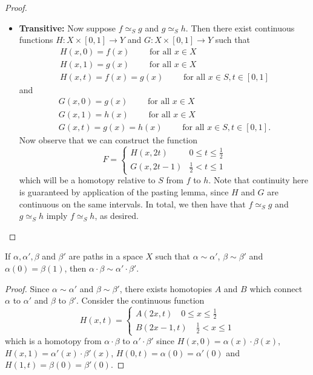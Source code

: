 \documentclass[a4paper,12pt,twoside]{hmcpset}
\begin{document}
\begin{proof}
\begin{itemize}
        \item \textbf{Transitive:} Now suppose $f \simeq_S g$ and $g \simeq_S h$.
        Then there exist continuous functions $H: X \times [0, 1] \to
        Y$ and $G : X \times [0, 1] \to Y$ such that 
        \begin{gather*}
            H(x, 0) = f(x) \qquad \text{ for all } x \in X\\
            H(x, 1) = g(x) \qquad \text{ for all } x \in X\\
            H(x, t) = f(x) = g(x) \qquad \text{ for all } x \in S, t \in [0, 1]
        \end{gather*}
        and 
        \begin{gather*}
            G(x, 0) = g(x) \qquad \text{ for all } x \in X\\
            G(x, 1) = h(x) \qquad \text{ for all } x \in X\\
            G(x, t) = g(x) = h(x) \qquad \text{ for all } x \in S, t \in [0, 1].
        \end{gather*}
        Now observe that we can construct the function
        \[
           F =
           \begin{cases}
               H(x, 2t) & 0 \le t \le \frac{1}{2}\\
               G(x, 2t - 1) & \frac{1}{2} < t \le 1
           \end{cases} 
        \]
        which will be a homotopy relative to $S$ from $f$ to $h$. Note
        that continuity here is guaranteed by application of the
        pasting lemma, since $H$ and $G$ are continuous on the same intervals. 
        In total, we then have that $f \simeq_S g$ and $g \simeq_S h$
        imply $f \simeq_S h$, as desired.
    \end{itemize}
\end{proof}

\begin{problem}[Theorem 13.3]
    If $\alpha, \alpha', \beta$ and $\beta'$ are paths in a space $X$
    such that $\alpha \sim \alpha'$, $\beta \sim \beta'$ and
    $\alpha(0) = \beta(1)$, then $\alpha \cdot \beta \sim \alpha'
    \cdot \beta'$.  
\end{problem}

\begin{proof}
    Since $\alpha \sim \alpha'$ and $\beta \sim \beta'$, there exists
    homotopies $A$ and $B$ which connect $\alpha$ to $\alpha'$ and
    $\beta$ to $\beta'$. Consider the continuous function 
    \[
        H(x, t) =
        \begin{cases}
            A(2x, t) \quad 0 \le x \le \frac{1}{2}\\
            B(2x - 1, t) \quad \frac{1}{2} < x \le 1
        \end{cases}  
    \]
    which is a homotopy from $\alpha \cdot \beta$ to $\alpha' \cdot
    \beta'$ since $H(x, 0) = \alpha(x)\cdot \beta(x)$, $H(x, 1) =
    \alpha'(x)\cdot \beta'(x)$, $H(0, t) =\alpha(0) = \alpha'(0)$ 
    and $H(1, t) = \beta(0) = \beta'(0)$.
    
    
\end{proof}
\end{document}
